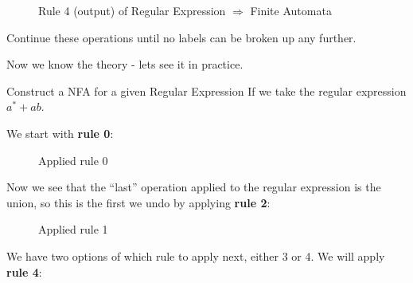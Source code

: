 \begin{description}
\begin{figure}[H]
    \caption{Rule 4 (output) of Regular Expression $\Rightarrow$ Finite Automata}
    \label{fig:regex-to-fa-rule4b}
\end{figure}

Continue these operations until no labels can be broken up any further.
\end{description}

Now we know the theory - lets see it in practice.

\begin{example}{Construct a NFA for a given Regular Expression}
If we take the regular expression $a^* + ab$.

We start with \textbf{rule 0}:
\begin{figure}[H]
    \centering
    \caption{Applied rule 0}
    \label{fig:regex-to-fa-eg-step1}
\end{figure}

Now we see that the ``last'' operation applied to the regular expression is the union, so this is the first we undo by applying \textbf{rule 2}:

\begin{figure}[H]
    \centering
    \caption{Applied rule 1}
    \label{fig:regex-to-fa-eg-step2}
\end{figure}

We have two options of which rule to apply next, either 3 or 4. We will apply \textbf{rule 4}:


\end{example}
